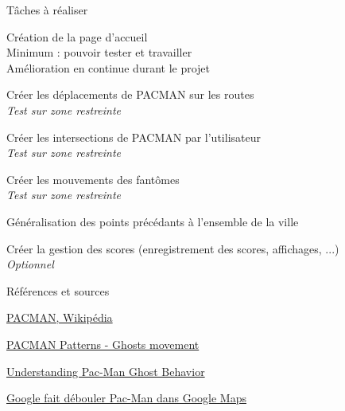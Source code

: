 \documentclass{beamer}
\newcommand{\optionnel}{{\color{orange} \textit{Optionnel}}}
\newcommand{\test}{{\color{blue} \textit{Test sur zone restreinte}}}
\begin{document}
\begin{frame}{Tâches à réaliser}
    \begin{outline}
        \item Création de la page d'accueil \\
              {\scriptsize Minimum : pouvoir tester et travailler \\
              Amélioration en continue durant le projet}
        \item Créer les déplacements de PACMAN sur les routes \\
              \test
        \item Créer les intersections de PACMAN par l'utilisateur \\
              \test
        \item Créer les mouvements des fantômes \\
              \test
        \item Généralisation des points précédants à l'ensemble de la ville \\
        \item Créer la gestion des scores (enregistrement des scores, affichages, ...) \\
              \optionnel
    \end{outline}
\end{frame}

\begin{frame}{Références et sources}
    \begin{outline}
        \item \href{https://fr.wikipedia.org/wiki/Pac-Man}{PACMAN, Wikipédia}
        \item \href{https://dev.to/code2bits/pac-man-patterns--ghost-movement-strategy-pattern-1k1a}{PACMAN Patterns - Ghosts movement}
        \item \href{https://gameinternals.com/understanding-pac-man-ghost-behavior}{Understanding Pac-Man Ghost Behavior}
        \item \href{https://www.lefigaro.fr/secteur/high-tech/2015/03/31/32001-20150331ARTFIG00349-google-fait-debouler-pac-man-dans-google-maps.php}{Google fait débouler Pac-Man dans Google Maps}
    \end{outline}
\end{frame}
\end{document}

